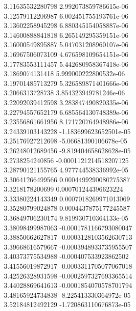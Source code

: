 {3.11635532280798 2.992073859786615e-06 \\
3.12579112206987 6.002451755193761e-06 \\
3.13602258945298 6.880345154058887e-06 \\
3.14600888841818 6.265149295359151e-06 \\
3.16000549895887 5.047031208960107e-06 \\
3.16967506073109 4.676598109654151e-06 \\
3.17783553111457 5.442680958367418e-06 \\
3.1869074131418 5.999000222800532e-06 \\
3.19701485713279 5.326589871401666e-06 \\
3.2066313728738 3.854323949781246e-06 \\
3.22092039412598 3.283847490820335e-06 \\
3.22794557652179 6.685564130748389e-06 \\
3.23556861661956 8.171720764948986e-06 \\
3.24339103143228 -1.183699623652501e-05 \\
3.25176927212698 -5.06681390106678e-05 \\
3.26248012689456 -9.819404658628628e-05 \\
3.2738254240856 -0.0001121214518207125 \\
3.28790121155765 4.977744538336992e-05 \\
3.30641266499566 0.0004499290080275387 \\
3.3218178200699 0.000701244396623224 \\
3.33380224143349 0.0007018269971013069 \\
3.35280799024878 0.0004437875177245587 \\
3.36849706230174 9.819930710364133e-05 \\
3.38098499987063 -0.0001781166793080047 \\
3.38850662627817 -0.0003128103562630713 \\
3.39668616579667 -0.0003948933735955507 \\
3.40373775534988 -0.000407533923862502 \\
3.41556019872917 -0.0003311705077067018 \\
3.42526328931598 -0.0002597327693365514 \\
3.44028869641613 -0.0001854070578701794 \\
3.48165924734838 -8.225413330364972e-05 \\
3.52184812492129 -1.720863110676873e-05 \\
}
